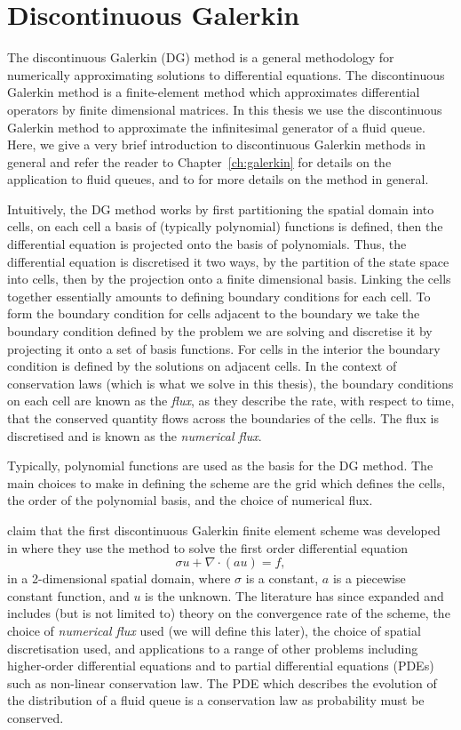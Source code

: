\section{Discontinuous Galerkin}\label{sec: dgdgdgdg}
The discontinuous Galerkin (DG) method is a general methodology for numerically approximating solutions to differential equations. The discontinuous Galerkin method is a finite-element method which approximates differential operators by finite dimensional matrices. In this thesis we use the discontinuous Galerkin method to approximate the infinitesimal generator of a fluid queue. Here, we give a very brief introduction to discontinuous Galerkin methods in general and refer the reader to Chapter~\ref{ch:galerkin} for details on the application to fluid queues, and to \cite{nodalDGBook} for more details on the method in general. 

Intuitively, the DG method works by first partitioning the spatial domain into cells, on each cell a basis of (typically polynomial) functions is defined, then the differential equation is projected onto the basis of polynomials. Thus, the differential equation is discretised it two ways, by the partition of the state space into cells, then by the projection onto a finite dimensional basis. Linking the cells together essentially amounts to defining boundary conditions for each cell. To form the boundary condition for cells adjacent to the boundary we take the boundary condition defined by the problem we are solving and discretise it by projecting it onto a set of basis functions. For cells in the interior the boundary condition is defined by the solutions on adjacent cells. In the context of conservation laws (which is what we solve in this thesis), the boundary conditions on each cell are known as the \emph{flux}, as they describe the rate, with respect to time, that the conserved quantity flows across the boundaries of the cells. The flux is discretised and is known as the \emph{numerical flux}.

Typically, polynomial functions are used as the basis for the DG method. The main choices to make in defining the scheme are the grid which defines the cells, the order of the polynomial basis, and the choice of numerical flux. 

\cite{nodalDGBook} claim that the first discontinuous Galerkin finite element scheme was developed in \cite{reed1973} where they use the method to solve the first order differential equation
\[\sigma u + \nabla \cdot (a u) = f,\]
in a 2-dimensional spatial domain, where \(\sigma\) is a constant, \(a\) is a piecewise constant function, and \(u\) is the unknown. The literature has since expanded and includes (but is not limited to) theory on the convergence rate of the scheme, the choice of \emph{numerical flux} used (we will define this later), the choice of spatial discretisation used, and applications to a range of other problems including higher-order differential equations and to partial differential equations (PDEs) such as non-linear conservation law. The PDE which describes the evolution of the distribution of a fluid queue is a conservation law as probability must be conserved. 

